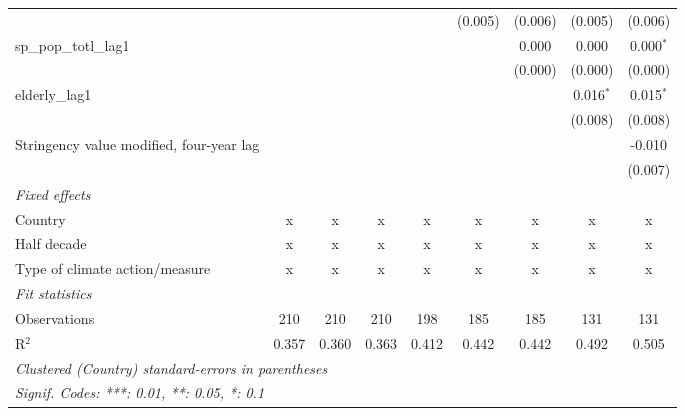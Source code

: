 \begin{tabular}{lcccccccc}
                                                                           &         &         &             &         & (0.005)     & (0.006)     & (0.005)       & (0.006)\\   
   sp\_pop\_totl\_lag1                                                     &         &         &             &         &             & 0.000       & 0.000         & 0.000$^{*}$\\   
                                                                           &         &         &             &         &             & (0.000)     & (0.000)       & (0.000)\\   
   elderly\_lag1                                                           &         &         &             &         &             &             & 0.016$^{*}$   & 0.015$^{*}$\\   
                                                                           &         &         &             &         &             &             & (0.008)       & (0.008)\\   
   Stringency value modified, four-year lag                                &         &         &             &         &             &             &               & -0.010\\   
                                                                           &         &         &             &         &             &             &               & (0.007)\\   
   \emph{Fixed effects}\\
   Country                                                                 & x       & x       & x           & x       & x           & x           & x             & x\\  
   Half decade                                                             & x       & x       & x           & x       & x           & x           & x             & x\\  
   Type of climate action/measure                                          & x       & x       & x           & x       & x           & x           & x             & x\\  
   \midrule \emph{Fit statistics}\\
   Observations                                                            & 210     & 210     & 210         & 198     & 185         & 185         & 131           & 131\\  
   R$^2$                                                                   & 0.357   & 0.360   & 0.363       & 0.412   & 0.442       & 0.442       & 0.492         & 0.505\\  
   \midrule
   \multicolumn{9}{l}{\emph{Clustered (Country) standard-errors in parentheses}}\\
   \multicolumn{9}{l}{\emph{Signif. Codes: ***: 0.01, **: 0.05, *: 0.1}}\\
\end{tabular}
\par\endgroup


